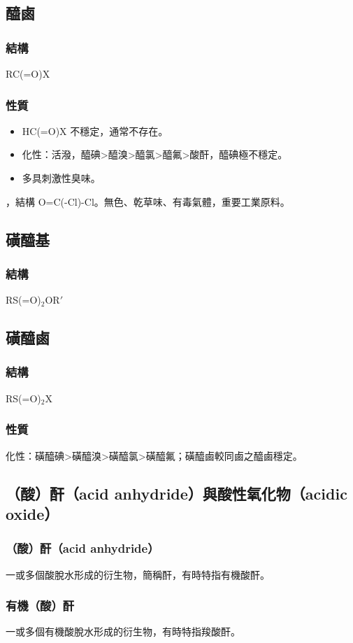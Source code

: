 \documentclass[a4paper,12pt]{report}
\begin{document}
\begin{itemize}
\subsection{醯鹵}
\subsubsection{結構}
RC(=O)X
\subsubsection{性質}
\begin{itemize}
\item HC(=O)X 不穩定，通常不存在。
\item 化性：活潑，醯碘>醯溴>醯氯>醯氟>酸酐，醯碘極不穩定。
\item 多具刺激性臭味。
\end{itemize}
，結構 O=C(-Cl)-Cl。無色、乾草味、有毒氣體，重要工業原料。
\subsection{磺醯基}
\subsubsection{結構}
RS(=O)$_2$OR$'$
\subsection{磺醯鹵}
\subsubsection{結構}
RS(=O)$_2$X
\subsubsection{性質}
化性：磺醯碘>磺醯溴>磺醯氯>磺醯氟；磺醯鹵較同鹵之醯鹵穩定。
\subsection{（酸）酐（acid anhydride）與酸性氧化物（acidic oxide）}
\subsubsection{（酸）酐（acid anhydride）}
一或多個酸脫水形成的衍生物，簡稱酐，有時特指有機酸酐。
\subsubsection{有機（酸）酐}
一或多個有機酸脫水形成的衍生物，有時特指羧酸酐。

\end{itemize}
\end{document}
